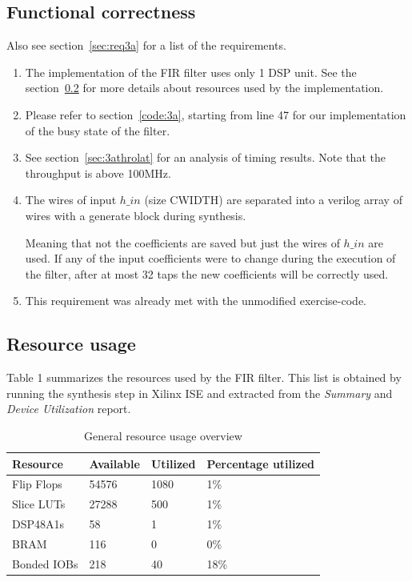 \documentclass[a4paper,twoside,11pt, fleqn]{article}
\begin{document}
\subsection{Functional correctness}
Also see section~\ref{sec:req3a} for a list of the requirements.
\begin{enumerate}
	\item The implementation of the FIR filter uses only 1 DSP unit. See the				section~\ref{sec:resc3a} for more details about resources used by 		the implementation.
	\item Please refer to section~\ref{code:3a}, starting from line 47 for our implementation of the busy state of the filter.
	\item See section~\ref{sec:3athrolat} for an analysis of timing results. Note that the throughput is above 100MHz.
	\item The wires of input $h\_in$ (size CWIDTH) are separated into a verilog 			array of wires with a generate block during synthesis. 
	
	Meaning that not the coefficients are saved but just the wires of $h\_in$ are used. If any of the input coefficients were to change during the execution of the filter, after at most 32 taps the new coefficients will be correctly used.
	\item This requirement was already met with the unmodified exercise-code.
\end{enumerate}

\subsection{Resource usage}
\label{sec:resc3a}

Table 1 summarizes the resources used by the FIR filter. This list is obtained by running the synthesis step in Xilinx ISE and extracted from the \textit{Summary} and \textit{Device Utilization} report.
\begin{table}[h]
\begin{tabular}{|l|l|l|l|}
\hline
\textbf{Resource} & \textbf{Available} & \textbf{Utilized} & \textbf{Percentage utilized}\\
\hline
Flip Flops	& 54576 & 1080 	& 1\%\\
Slice LUTs 	& 27288 & 500 	& 1\%\\
DSP48A1s	& 58 	& 1 	& 1\%\\
BRAM		& 116 	& 0 	& 0\%\\
Bonded IOBs	& 218 	& 40 	& 18\%\\
\hline
\end{tabular}
\caption{General resource usage overview}
\end{table}
\end{document}

